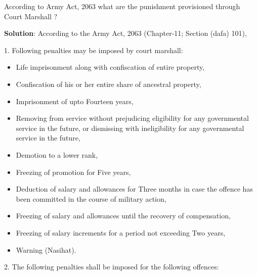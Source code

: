 \documentclass[
  openany]{book}
\newcommand{\question}{\item}
\newenvironment{solution}{ {\bfseries Solution}:}{}
\begin{document}
\begin{questions}
\question According to Army Act, 2063 what are the punishment provisioned through Court Marshall ?

\begin{solution}
According to the Army Act, 2063 (Chapter-11; Section (dafa) 101), 

1. Following penalties may be imposed by court marshall:

\begin{itemize}
\item Life imprisonment along with confiscation of entire property,
\item Confiscation of his or her entire share of ancestral property,
\item Imprisonment of upto Fourteen years,
\item Removing from service without prejudicing eligibility for any governmental service in the future, or dismissing with ineligibility for any governmental service in the future,
\item Demotion to a lower rank,
\item Freezing of promotion for Five years,
\item Deduction of salary and allowances for Three months in case the offence has been committed in the course of military action,
\item Freezing of salary and allowances until the recovery of compensation,
\item Freezing of salary increments for a period not  exceeding Two years,
\item Warning (Nasihat).
\end{itemize}

2. The following penalties shall be imposed for the following offences:


\end{solution}
\end{questions}
\end{document}
